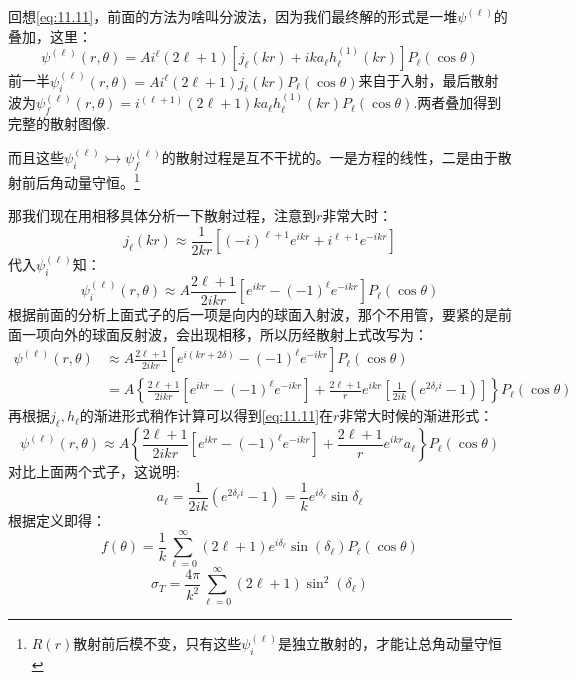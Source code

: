 \documentclass[a4paper,zihao=-4,linespread=1]{ctexrep}
\begin{document}
	回想\ref{eq:11.11}，前面的方法为啥叫分波法，因为我们最终解的形式是一堆$\psi^{(\ell)}$的叠加，这里：
	\[\psi^{(\ell)}(r,\theta)=A i^\ell(2\ell+1)\left[j_\ell(kr)+ika_\ell h^{(1)}_\ell(kr)\right]P_\ell(\cos\theta)\]
	前一半$\psi^{(\ell)}_i(r,\theta)=A i^\ell(2\ell+1)j_\ell(kr)P_\ell(\cos\theta)$来自于入射，最后散射波为$\psi^{(\ell)}_f(r,\theta)=i^{(\ell+1)}(2\ell+1)ka_\ell h^{(1)}_\ell(kr)P_\ell(\cos\theta)$.两者叠加得到完整的散射图像.
	
	而且这些$\psi^{(\ell)}_i\rightarrowtail\psi^{(\ell)}_f$的散射过程是互不干扰的。一是方程的线性，二是由于散射前后角动量守恒。\footnote{$R(r)$散射前后模不变，只有这些$\psi^{(\ell)}_i$是独立散射的，才能让总角动量守恒}
	
	那我们现在用相移具体分析一下散射过程，注意到$r$非常大时：
	$$j_\ell(kr)\approx \frac{1}{2kr}\left[(-i)^{\ell+1}e^{ikr}+i^{\ell+1}e^{-ikr}\right]$$
	代入$\psi^{(\ell)}_i$知：
	\[\psi^{(\ell)}_i(r,\theta)\approx A\frac{2\ell+1}{2ikr}\left[e^{ikr}-(-1)^\ell e^{-ikr}\right]P_\ell(\cos\theta)\]
	根据前面的分析上面式子的后一项是向内的球面入射波，那个不用管，要紧的是前面一项向外的球面反射波，会出现相移，所以历经散射上式改写为：
	\begin{equation}
		\begin{aligned}
		\psi^{(\ell)}(r,\theta)&\approx A\frac{2\ell+1}{2ikr}\left[e^{i(kr+2\delta)}-(-1)^\ell e^{-ikr}\right]P_\ell(\cos\theta)\\
		&=A\left\{\frac{2\ell+1}{2ikr}\left[e^{ikr}-(-1)^\ell e^{-ikr}\right]+\frac{2\ell+1}{r}e^{ikr}\left[\frac{1}{2ik}(e^{2\delta_\ell i}-1)\right]\right\}P_\ell(\cos\theta)
		\end{aligned}
	\end{equation}	
	再根据$j_\ell,h_\ell$的渐进形式稍作计算可以得到\ref{eq:11.11}在$r$非常大时候的渐进形式：
	\[\psi^{(\ell)}(r,\theta)\approx A\left\{\frac{2\ell+1}{2ikr}\left[e^{ikr}-(-1)^\ell e^{-ikr}\right]+\frac{2\ell+1}{r}e^{ikr}a_\ell\right\}P_\ell(\cos\theta)\]
	对比上面两个式子，这说明:
	\begin{equation}
		a_\ell=\frac{1}{2ik}(e^{2\delta_\ell i}-1)=\frac{1}{k}e^{i\delta_\ell}\sin\delta_\ell
	\end{equation}
	根据定义即得：
	\begin{equation}
		\label{eq:11.14}
		f(\theta)=\frac{1}{k} \sum_{\ell=0}^{\infty}(2 \ell+1) e^{i \delta_{\ell}} \sin \left(\delta_{\ell}\right) P_{\ell}(\cos \theta)
	\end{equation}
	\begin{equation}
		\label{eq:11.15}
		\sigma_T=\frac{4 \pi}{k^{2}} \sum_{\ell=0}^{\infty}(2 \ell+1) \sin ^{2}\left(\delta_{\ell}\right) 
	\end{equation}
	
\end{document}

